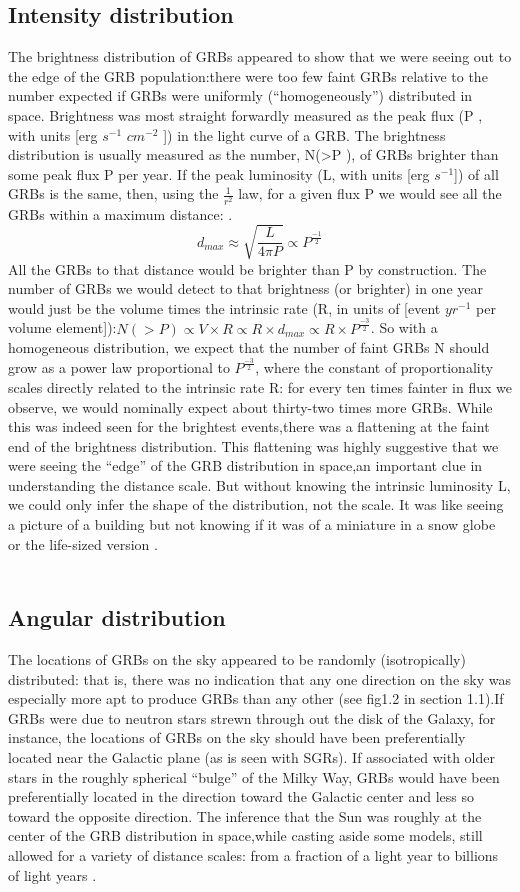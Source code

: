 \subsection{Intensity distribution}
The brightness distribution of GRBs appeared to show that we were seeing out to the edge of the GRB population:there were too few faint GRBs relative to the number expected if GRBs were uniformly (“homogeneously”) distributed in space.
Brightness was most straight forwardly measured as the peak flux (P , with units [erg $ s^{-1} $ $cm^{-2} $ ]) in the light curve of a GRB. The brightness distribution is usually measured as the number, N(>P ), of GRBs brighter than some peak flux P per year. If the peak luminosity (L, with units [erg $ s^{-1} $]) of all GRBs is the same, then, using the $\frac{1}{r^{2}}$ law, for a given flux P we would see all the GRBs within a maximum distance:\citep{7} \citep{12}.
$$
d_{max}\approx\sqrt{\frac{L}{4\pi P}}\varpropto P^{\frac{-1}{2}}
$$
All the GRBs to that distance would be brighter than P by construction. The
number of GRBs we would detect to that brightness (or brighter) in one year would
just be the volume times the intrinsic rate (R, in units of [event $yr^{-1}$ per volume element]):$ N (> P ) \propto V \times R \propto R \times d_{max} \propto R \times P^{\frac{-3}{2}}$.  So with a homogeneous distribution, we expect that the number of faint GRBs N should grow as a power law proportional to $P^{\frac{-3}{2}} $, where the constant of proportionality scales directly related to the intrinsic rate R: for every ten times fainter in flux we observe, we would nominally expect about thirty-two times more GRBs. While this was indeed seen for the brightest events,there was a flattening at the faint end of the brightness distribution. This flattening was highly suggestive that we were seeing the “edge” of the GRB distribution in space,an important clue in understanding the distance scale. But without knowing the intrinsic luminosity L, we could only infer the shape of the distribution, not the scale. It was like seeing a picture of a building but not knowing if it was of a miniature in a snow globe or the life-sized version \citep{7}\citep{12}.\\\\
\subsection{Angular distribution}
The locations of GRBs on the sky appeared to be randomly (isotropically) distributed:
that is, there was no indication that any one direction on the sky was especially
more apt to produce GRBs than any other (see fig1.2 in section 1.1).If GRBs were due to neutron stars strewn through out the disk of the Galaxy, for instance, the locations of GRBs on the sky should have been preferentially located near the Galactic plane (as is seen with SGRs). If associated with older stars in the roughly spherical “bulge” of the Milky Way, GRBs would have been preferentially located in the direction toward the Galactic center and less so toward the opposite direction.
The inference that the Sun was roughly at the center of the GRB distribution in space,while casting aside some models, still allowed for a variety of distance scales: from a fraction of a light year to billions of light years \citep{7}.

